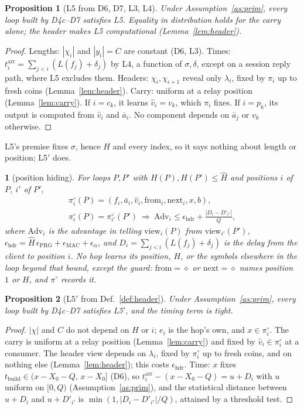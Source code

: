 \documentclass[journal]{IEEEtran}
\newtheorem{proposition}{Proposition}
\newcommand{\namedhead}{}
\newtheorem*{namedenv}{\namedhead}
\newenvironment{lawL}[2]{\renewcommand{\namedhead}{Law #1}%
  \begin{namedenv}[#2]}{\end{namedenv}}
\newcommand{\cl}{\diamond}
\newcommand{\view}{\mathrm{view}}
\newcommand{\nxt}{\mathrm{next}}
\newcommand{\frm}{\mathrm{from}}
\newcommand{\arr}{t^{\mathrm{arr}}}
\newcommand{\Hm}{\hat H}
\newcommand{\PRG}{\mathrm{PRG}}
\newcommand{\MAC}{\mathrm{MAC}}
\newcommand{\vh}[1]{\hat v_{#1}}
\begin{document}
\begin{proposition}[L5 from D6, D7, L3, L4]\label{prop:ni}
Under Assumption~\ref{as:prim}, every loop built by
D4c--D7 satisfies L5.  Equality in distribution holds for the carry
alone; the header makes L5 computational (Lemma~\ref{lem:header}).
\end{proposition}
\begin{proof}
Lengths: $|\chi_i|$ and $|y_i|=C$ are constant (D6, L3).  Times:
$\arr_i=\sum_{j<i}(L(f_j)+\delta_j)$ by L4, a function of $\sigma,\delta$,
except on a session reply path, where L5 excludes them.
Headers: $\chi_i,\chi_{i+1}$ reveal only $\lambda_i$, fixed by $\pi_i$ up
to fresh coins (Lemma~\ref{lem:header}).  Carry: uniform at a relay
position (Lemma~\ref{lem:carry}).  If $i=c_k$, it learns $\vh i=v_k$,
which $\pi_i$ fixes.  If $i=p_k$, its output is computed from $\vh i$
and $\bar a_i$.  No component depends on $\bar a_j$ or $v_k$ otherwise.
\end{proof}

L5's premise fixes $\sigma$, hence $H$ and every index, so it says nothing
about length or position; L5$'$ does.

\begin{lawL}{L5$'$}{position hiding}
For loops $P,P'$ with $H(P),H(P')\le\Hm$ and positions $i$ of $P$, $i'$
of $P'$,
\begin{gather*}
\pi^{\circ}_i(P)=(f_i,\bar a_i,\vh i,\frm_i,\nxt_i,x,b),\\
\pi^{\circ}_i(P)=\pi^{\circ}_{i'}(P')\ \Rightarrow\
\mathrm{Adv}_i\le\epsilon_{\mathrm{hdr}}+\frac{|D_i-D'_{i'}|}{Q},
\end{gather*}
where $\mathrm{Adv}_i$ is the advantage in telling $\view_i(P)$ from
$\view_{i'}(P')$, $\epsilon_{\mathrm{hdr}}=\Hm\,\epsilon_{\PRG}
+\epsilon_{\MAC}+\epsilon_{\alpha}$, and
$D_i=\sum_{j<i}(L(f_j)+\delta_j)$ is the delay from the client to
position $i$.  No hop learns its position, $H$, or the symbols elsewhere
in the loop beyond that bound, except the guard: $\frm=\cl$ or $\nxt=\cl$
names position $1$ or $H$, and $\pi^{\circ}$ records it.
\end{lawL}

\begin{proposition}[L5$'$ from Def.~\ref{def:header}]\label{prop:pos}
Under Assumption~\ref{as:prim}, every loop built by D4c--D7 satisfies
L5$'$, and the timing term is tight.
\end{proposition}
\begin{proof}
$|\chi|$ and $C$ do not depend on $H$ or $i$; $e_i$ is the hop's own, and
$x\in\pi^{\circ}_i$.  The carry is uniform at a relay position
(Lemma~\ref{lem:carry}) and fixed by $\vh i\in\pi^{\circ}_i$ at a
consumer.  The header view depends on $\lambda_i$, fixed by
$\pi^{\circ}_i$ up to fresh coins, and on nothing else
(Lemma~\ref{lem:header}); this costs $\epsilon_{\mathrm{hdr}}$.  Time:
$x$ fixes $t_{\mathrm{build}}\in(x-X_0-Q,\,x-X_0]$ (D6), so
$\arr_i-(x-X_0-Q)=u+D_i$ with $u$ uniform on $[0,Q)$
(Assumption~\ref{as:prim}), and the statistical distance between
$u+D_i$ and $u+D'_{i'}$ is $\min(1,|D_i-D'_{i'}|/Q)$, attained by a
threshold test.
\end{proof}
\end{document}
